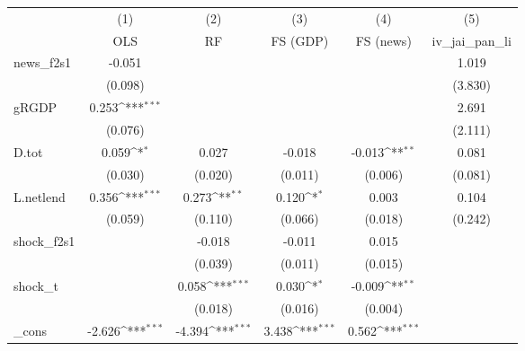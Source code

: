 {
\def\sym#1{\ifmmode^{#1}\else\(^{#1}\)\fi}
\begin{tabular}{l*{5}{c}}
\toprule
            &\multicolumn{1}{c}{(1)}&\multicolumn{1}{c}{(2)}&\multicolumn{1}{c}{(3)}&\multicolumn{1}{c}{(4)}&\multicolumn{1}{c}{(5)}\\
            &\multicolumn{1}{c}{OLS}&\multicolumn{1}{c}{RF}&\multicolumn{1}{c}{FS (GDP)}&\multicolumn{1}{c}{FS (news)}&\multicolumn{1}{c}{iv\_jai\_pan\_li}\\
\midrule
news\_f2s1   &      -0.051         &                     &                     &                     &       1.019         \\
            &     (0.098)         &                     &                     &                     &     (3.830)         \\
\addlinespace
gRGDP       &       0.253\sym{***}&                     &                     &                     &       2.691         \\
            &     (0.076)         &                     &                     &                     &     (2.111)         \\
\addlinespace
D.tot       &       0.059\sym{*}  &       0.027         &      -0.018         &      -0.013\sym{**} &       0.081         \\
            &     (0.030)         &     (0.020)         &     (0.011)         &     (0.006)         &     (0.081)         \\
\addlinespace
L.netlend   &       0.356\sym{***}&       0.273\sym{**} &       0.120\sym{*}  &       0.003         &       0.104         \\
            &     (0.059)         &     (0.110)         &     (0.066)         &     (0.018)         &     (0.242)         \\
\addlinespace
shock\_f2s1  &                     &      -0.018         &      -0.011         &       0.015         &                     \\
            &                     &     (0.039)         &     (0.011)         &     (0.015)         &                     \\
\addlinespace
shock\_t     &                     &       0.058\sym{***}&       0.030\sym{*}  &      -0.009\sym{**} &                     \\
            &                     &     (0.018)         &     (0.016)         &     (0.004)         &                     \\
\addlinespace
\_cons      &      -2.626\sym{***}&      -4.394\sym{***}&       3.438\sym{***}&       0.562\sym{***}&                     \\

\end{tabular}}
